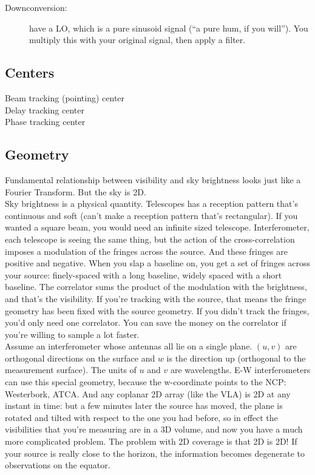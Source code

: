 \documentclass[a4paper]{article}
\begin{document}
\begin{description}
\item[Downconversion:] have a LO, which is a pure sinusoid signal (``a pure hum, if you will''). You multiply this with your original signal, then apply a filter.
\end{description}

\subsection{Centers}

\begin{description}
\item[Beam tracking (pointing) center]
\item[Delay tracking center]
\item[Phase tracking center]
\end{description}

\subsection{Geometry}

Fundamental relationship between visibility and sky brightness looks just like a Fourier Transform. But the sky is 2D. \\

Sky brightness is a physical quantity. Telescopes has a reception pattern that's continuous and soft (can't make a reception pattern that's rectangular). If you wanted a square beam, you would need an infinite sized telescope. Interferometer, each telescope is seeing the same thing, but the action of the cross-correlation imposes a modulation of the fringes across the source. And these fringes are positive and negative. When you slap a baseline on, you get a set of fringes across your source: finely-spaced with a long baseline, widely spaced with a short baseline. The correlator sums the product of the modulation with the brightness, and that's the visibility. If you're tracking with the source, that means the fringe geometry has been fixed with the source geometry. If you didn't track the fringes, you'd only need one correlator. You can save the money on the correlator if you're willing to sample a lot faster. \\

Assume an interferometer whose antennas all lie on a single plane. $(u,v)$ are orthogonal directions on the surface and $w$ is the direction up (orthogonal to the measurement surface). The units of $u$ and $v$ are wavelengths. E-W interferometers can use this special geometry, because the w-coordinate points to the NCP: Westerbork, ATCA. And any coplanar 2D array (like the VLA) is 2D at any instant in time: but a few minutes later the source has moved, the plane is rotated and tilted with respect to the one you had before, so in effect the visibilities that you're measuring are in a 3D volume, and now you have a much more complicated problem. The problem with 2D coverage is that 2D is 2D! If your source is really close to the horizon, the information becomes degenerate to observations on the equator. \\
\end{document}
